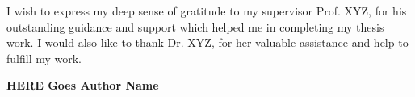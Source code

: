 
I wish to express my deep sense of gratitude to my supervisor
Prof. XYZ, for his outstanding guidance and support which helped me in completing my thesis work.
I would also like to thank Dr. XYZ, for her valuable assistance and help to fulfill my work.

\vspace{24pt}
{\hfill\bfseries HERE Goes Author Name\par}
